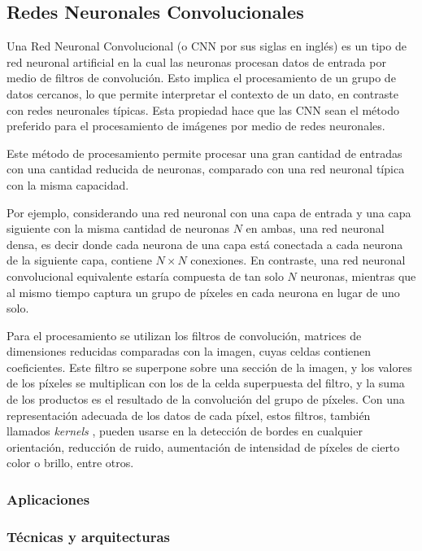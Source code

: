 \subsection{Redes Neuronales Convolucionales}

Una Red Neuronal Convolucional (o CNN por sus siglas en inglés) es un tipo de red neuronal artificial en la cual las
neuronas procesan datos de entrada por medio de filtros de convolución. Esto implica el procesamiento de un grupo de
datos cercanos, lo que permite interpretar el contexto de un dato, en contraste con redes neuronales típicas. Esta
propiedad hace que las CNN sean el método preferido para el procesamiento de imágenes por medio de redes neuronales.
\autocite{hands-on-machine-learning} \autocite{ciresan-cnn}

Este método de procesamiento permite procesar una gran cantidad de entradas con una cantidad reducida de neuronas,
comparado con una red neuronal típica con la misma capacidad.

Por ejemplo, considerando una red neuronal con una capa de entrada y una capa siguiente con la misma cantidad de
neuronas $N$ en ambas, una red neuronal densa, es decir donde cada neurona de una capa está conectada a cada neurona de
la siguiente capa, contiene $N \times N$ conexiones. En contraste, una red neuronal convolucional equivalente estaría
compuesta de tan solo $N$ neuronas, mientras que al mismo tiempo captura un grupo de píxeles en cada neurona en lugar
de uno solo.

Para el procesamiento se utilizan los filtros de convolución, matrices de dimensiones reducidas comparadas con la
imagen, cuyas celdas contienen coeficientes. Este filtro se superpone sobre una sección de la imagen, y los valores de
los píxeles se multiplican con los de la celda superpuesta del filtro, y la suma de los productos es el resultado de la
convolución del grupo de píxeles. Con una representación adecuada de los datos de cada píxel, estos filtros, también
llamados {\it kernels }, pueden usarse en la detección de bordes en cualquier orientación, reducción de ruido,
aumentación de intensidad de píxeles de cierto color o brillo, entre otros. \autocite{ciresan-cnn}

\subsubsection{Aplicaciones}

\subsubsection{Técnicas y arquitecturas}
